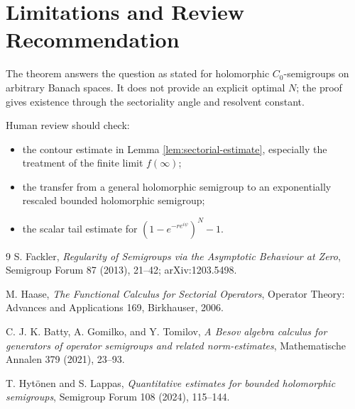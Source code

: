 \documentclass[11pt]{article}
\begin{document}
\section*{Limitations and Review Recommendation}

The theorem answers the question as stated for holomorphic \(C_0\)-semigroups
on arbitrary Banach spaces.  It does not provide an explicit optimal \(N\);
the proof gives existence through the sectoriality angle and resolvent
constant.

Human review should check:
\begin{itemize}
  \item the contour estimate in Lemma \ref{lem:sectorial-estimate}, especially
  the treatment of the finite limit \(f(\infty)\);
  \item the transfer from a general holomorphic semigroup to an exponentially
  rescaled bounded holomorphic semigroup;
  \item the scalar tail estimate for
  \((1-e^{-re^{i\psi}})^N-1\).
\end{itemize}

\begin{thebibliography}{9}
S. Fackler,
\emph{Regularity of Semigroups via the Asymptotic Behaviour at Zero},
Semigroup Forum 87 (2013), 21--42; arXiv:1203.5498.

M. Haase,
\emph{The Functional Calculus for Sectorial Operators},
Operator Theory: Advances and Applications 169, Birkhauser, 2006.

C. J. K. Batty, A. Gomilko, and Y. Tomilov,
\emph{A Besov algebra calculus for generators of operator semigroups and
related norm-estimates},
Mathematische Annalen 379 (2021), 23--93.

T. Hytönen and S. Lappas,
\emph{Quantitative estimates for bounded holomorphic semigroups},
Semigroup Forum 108 (2024), 115--144.
\end{thebibliography}
\end{document}
